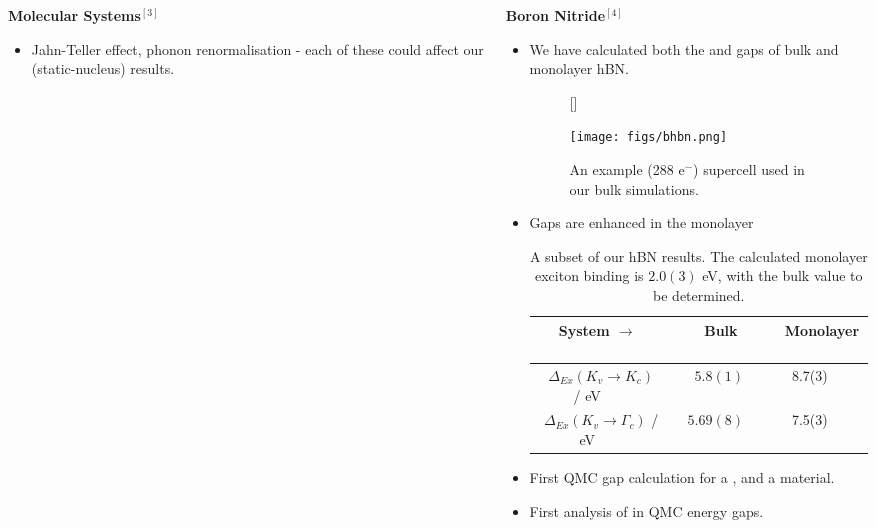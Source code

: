 \documentclass[hyperref={draft}, table, xcdraw]{beamer}
\newcommand{\red}[1]{{\bf\color{EmphCol}{#1}}}
\begin{document}
\begin{frame}[fragile]
\begin{columns}[T]
\begin{column}{.47\textwidth}
\begin{block}{{\bf\large Molecular Systems$^{[3]}$}}
\begin{itemize}
  \item \red{Potential caveats:} Jahn-Teller effect, phonon renormalisation -
  each of these could affect our (static-nucleus) results.

  \end{itemize}

\end{block}

\end{column}

\hfill

\begin{column}{.47\textwidth}

\begin{block}{{\bf\large Boron Nitride$^{[4]}$}}
\begin{itemize}
\item We have calculated both the \red{excitonic} and \red{quasiparticle} gaps
of bulk and monolayer hBN.


\begin{figure}[H]
  [\FBwidth]
  {\caption{An example (288 e$^-$) supercell used in our
  bulk simulations.}\label{fig:bhbn}}
  {\texttt{[image: figs/bhbn.png]}}
\end{figure}

\item \red{Main Point:} Gaps are \red{strongly} enhanced in the monolayer

\begin{table}[H]
\centering
\vspace{0.2cm}
\caption{A subset of our hBN results. The calculated monolayer exciton binding
is $2.0(3)$ eV, with the bulk value to be determined.}
\label{hbn_table}
\begin{tabular}{|c||cc|}
\hline
System $\rightarrow$ &\ \ \  Bulk \ \ &\ \ \ Monolayer \ \ \\ \hline \hline
\ $\Delta_{Ex}(K_v \rightarrow K_c)$ / eV\ \ \ &\ \ \ $5.8(1)$ & 8.7(3)  \\
\ $\Delta_{Ex}(K_v \rightarrow \Gamma_c)$ / eV\ \ \ &\ \ $5.69(8)$ & 7.5(3)  \\ \hline
\end{tabular}
\end{table}

\item First QMC gap calculation for a \red{layered}, and a \red{2D} material.
\item First analysis of \red{finite size effects} in QMC energy gaps.
\end{itemize}


\end{block}
\end{column}
\end{columns}
\end{frame}
\end{document}
